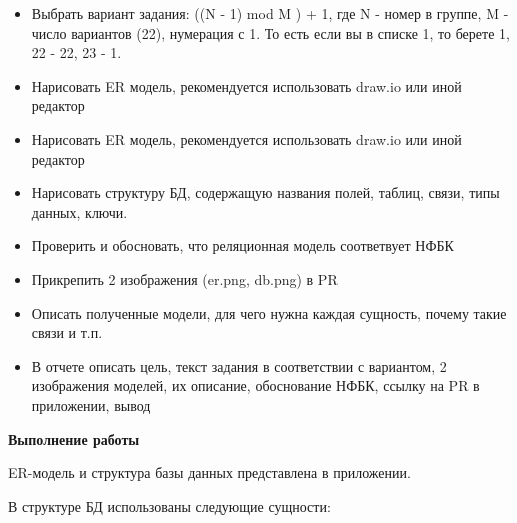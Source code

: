 \documentclass{article}
\begin{document}
\begin{itemize}
    \item Выбрать вариант задания: ((N - 1) mod M ) + 1, где N - номер в группе, M - число вариантов (22), нумерация с 1. То есть если вы в списке 1, то берете 1, 22 - 22, 23 - 1.
    \item  Нарисовать ER модель, рекомендуется использовать draw.io или иной редактор
    \item Нарисовать ER модель, рекомендуется использовать draw.io или иной редактор
    \item Нарисовать структуру БД, содержащую названия полей, таблиц, связи, типы данных, ключи.
    \item Проверить и обосновать, что реляционная модель соответвует НФБК
    \item Прикрепить 2 изображения (er.png, db.png) в PR
    \item Описать полученные модели, для чего нужна каждая сущность, почему такие связи и т.п.
    \item В отчете описать цель, текст задания в соответствии с вариантом, 2 изображения моделей, их описание, обоснование НФБК, ссылку на PR в приложении, вывод

\end{itemize}

\textbf{Выполнение работы}

ER-модель и структура базы данных представлена в приложении.

В структуре БД использованы следующие сущности:
\end{document}
